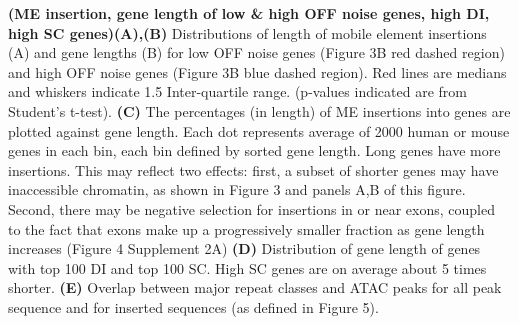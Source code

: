\textbf{(ME insertion, gene length of low & high OFF noise genes, high DI, high SC genes)}\textbf{(A),(B)} Distributions of length of mobile element insertions (A) and gene lengths (B) for low OFF noise genes (Figure 3B red dashed region) and high OFF noise genes (Figure 3B blue dashed region). Red lines are medians and whiskers indicate 1.5 Inter-quartile range. (p-values indicated are from Student’s t-test). \textbf{(C)} The percentages (in length) of ME insertions into genes are plotted against gene length. Each dot represents average of 2000 human or mouse genes in each bin, each bin defined by sorted gene length. Long genes have more insertions. This may reflect two effects: first, a subset of shorter genes may have inaccessible chromatin, as shown in Figure 3 and panels A,B of this figure. Second, there may be negative selection for insertions in or near exons, coupled to the fact that exons make up a progressively smaller fraction as gene length increases (Figure 4 Supplement 2A) \textbf{(D)} Distribution of gene length of genes with top 100 DI and top 100 SC. High SC genes are on average about 5 times shorter. \textbf{(E)} Overlap between major repeat classes and ATAC peaks for all peak sequence and for inserted sequences (as defined in Figure 5).